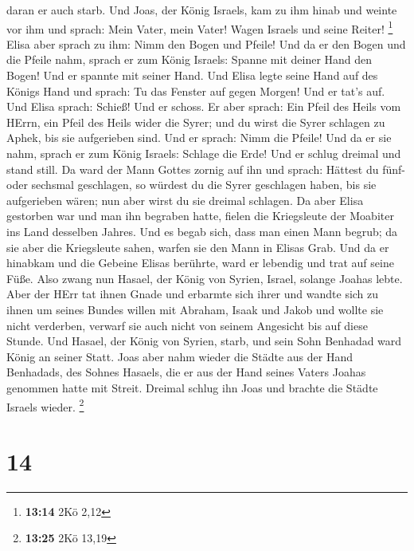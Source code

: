 daran er auch starb. Und Joas, der König Israels, kam zu ihm hinab und
weinte vor ihm und sprach: Mein Vater, mein Vater! Wagen Israels und
seine Reiter! \footnote{\textbf{13:14} 2Kö 2,12}  Elisa
aber sprach zu ihm: Nimm den Bogen und Pfeile! Und da er den Bogen und
die Pfeile nahm,  sprach er zum König Israels: Spanne mit
deiner Hand den Bogen! Und er spannte mit seiner Hand. Und Elisa legte
seine Hand auf des Königs Hand  und sprach: Tu das Fenster
auf gegen Morgen! Und er tat's auf. Und Elisa sprach: Schieß! Und er
schoss. Er aber sprach: Ein Pfeil des Heils vom HErrn, ein Pfeil des
Heils wider die Syrer; und du wirst die Syrer schlagen zu Aphek, bis sie
aufgerieben sind.  Und er sprach: Nimm die Pfeile! Und da
er sie nahm, sprach er zum König Israels: Schlage die Erde! Und er
schlug dreimal und stand still.  Da ward der Mann Gottes
zornig auf ihn und sprach: Hättest du fünf- oder sechsmal geschlagen, so
würdest du die Syrer geschlagen haben, bis sie aufgerieben wären; nun
aber wirst du sie dreimal schlagen.  Da aber Elisa
gestorben war und man ihn begraben hatte, fielen die Kriegsleute der
Moabiter ins Land desselben Jahres.  Und es begab sich,
dass man einen Mann begrub; da sie aber die Kriegsleute sahen, warfen
sie den Mann in Elisas Grab. Und da er hinabkam und die Gebeine Elisas
berührte, ward er lebendig und trat auf seine Füße.  Also
zwang nun Hasael, der König von Syrien, Israel, solange Joahas lebte.
 Aber der HErr tat ihnen Gnade und erbarmte sich ihrer und
wandte sich zu ihnen um seines Bundes willen mit Abraham, Isaak und
Jakob und wollte sie nicht verderben, verwarf sie auch nicht von seinem
Angesicht bis auf diese Stunde.  Und Hasael, der König von
Syrien, starb, und sein Sohn Benhadad ward König an seiner Statt.
 Joas aber nahm wieder die Städte aus der Hand Benhadads,
des Sohnes Hasaels, die er aus der Hand seines Vaters Joahas genommen
hatte mit Streit. Dreimal schlug ihn Joas und brachte die Städte Israels
wieder. \footnote{\textbf{13:25} 2Kö 13,19}

\hypertarget{section-4}{%
\section{14}\label{section-4}}

